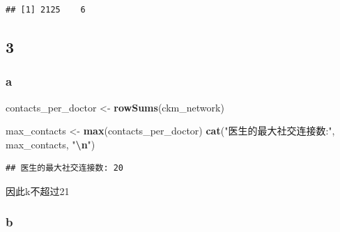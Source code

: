 \documentclass[
]{article}
\newenvironment{Shaded}{\begin{snugshade}}{\end{snugshade}}
\newcommand{\CommentTok}[1]{\textcolor[rgb]{0.56,0.35,0.01}{\textit{#1}}}
\newcommand{\FunctionTok}[1]{\textcolor[rgb]{0.13,0.29,0.53}{\textbf{#1}}}
\newcommand{\NormalTok}[1]{#1}
\newcommand{\OtherTok}[1]{\textcolor[rgb]{0.56,0.35,0.01}{#1}}
\newcommand{\SpecialCharTok}[1]{\textcolor[rgb]{0.81,0.36,0.00}{\textbf{#1}}}
\newcommand{\StringTok}[1]{\textcolor[rgb]{0.31,0.60,0.02}{#1}}
\begin{document}
\begin{Shaded}
\end{Shaded}

\begin{verbatim}
## [1] 2125    6
\end{verbatim}

\subsection{3}\label{section-2}

\subsubsection{a}\label{a}

\begin{Shaded}
\begin{Highlighting}[]
\NormalTok{contacts\_per\_doctor }\OtherTok{\textless{}{-}} \FunctionTok{rowSums}\NormalTok{(ckm\_network)}

\NormalTok{max\_contacts }\OtherTok{\textless{}{-}} \FunctionTok{max}\NormalTok{(contacts\_per\_doctor)}
\FunctionTok{cat}\NormalTok{(}\StringTok{"医生的最大社交连接数:"}\NormalTok{, max\_contacts, }\StringTok{"}\SpecialCharTok{\textbackslash{}n}\StringTok{"}\NormalTok{)}
\end{Highlighting}
\end{Shaded}

\begin{verbatim}
## 医生的最大社交连接数: 20
\end{verbatim}

因此k不超过21

\subsubsection{b}\label{b}
\end{document}
